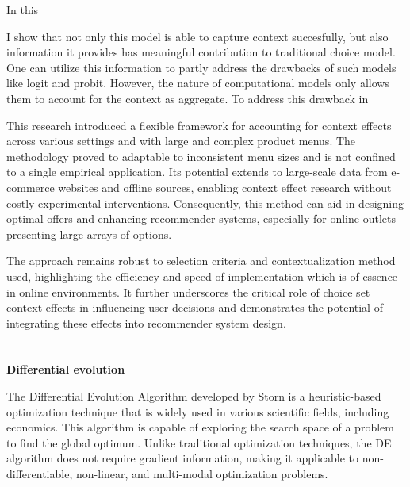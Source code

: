 \documentclass[a4paper,12pt]{article}
\newcommand{\citeyearonly}[1]{\citeyearpar{#1}}
\begin{document}
In this 

 I show that not only this model is able to capture context succesfully, but also information it provides has meaningful contribution to traditional choice model. One can utilize this information to partly address the drawbacks of such models like logit and probit. However, the nature of computational models only allows them to account for the context as aggregate. To address this drawback in 

 This research introduced a flexible framework for accounting for context effects across various settings and with large and complex product menus. The methodology proved to adaptable to inconsistent menu sizes and is not confined to a single empirical application. Its potential extends to large-scale data from e-commerce websites and offline sources, enabling context effect research without costly experimental interventions. Consequently, this method can aid in designing optimal offers and enhancing recommender systems, especially for online outlets presenting large arrays of options. 

 The approach remains robust to selection criteria and contextualization method used, highlighting the efficiency and speed of implementation which is of essence in online environments. It further underscores the critical role of choice set context effects in influencing user decisions and demonstrates the potential of integrating these effects into recommender system design.


\newpage

%




\clearpage

\appendix
\section{}\label{appendix:Differential evolution}
\textbf{Differential evolution}

The Differential Evolution Algorithm developed by Storn \citeyearonly{storn1997differential} is a heuristic-based optimization technique that is widely used in various scientific fields, including economics. This algorithm is capable of exploring the search space of a problem to find the global optimum. Unlike traditional optimization techniques, the DE algorithm does not require gradient information, making it applicable to non-differentiable, non-linear, and multi-modal optimization problems.
\end{document}
